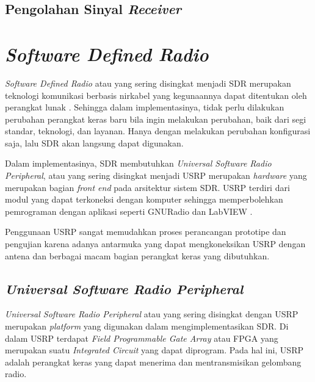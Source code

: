 
\subsection{Pengolahan Sinyal \textit{Receiver}}



\section{\textit{Software Defined Radio}}
\textit{Software Defined Radio} atau yang sering disingkat menjadi SDR merupakan teknologi komunikasi berbasis nirkabel yang kegunaannya dapat ditentukan oleh perangkat lunak \cite{Anisah2018}. Sehingga dalam implementasinya, tidak perlu dilakukan perubahan perangkat keras baru bila ingin melakukan perubahan, baik dari segi standar, teknologi, dan layanan. Hanya dengan melakukan perubahan konfigurasi saja, lalu SDR akan langsung dapat digunakan. 

Dalam implementasinya, SDR membutuhkan \textit{Universal Software Radio Peripheral}, atau yang sering disingkat menjadi USRP merupakan \textit{hardware} yang merupakan bagian \textit{front end} pada arsitektur sistem SDR. USRP terdiri dari modul yang dapat terkoneksi dengan komputer sehingga memperbolehkan pemrograman dengan aplikasi seperti GNURadio dan LabVIEW \cite{Gulo2023}. 

Penggunaan USRP sangat memudahkan proses perancangan prototipe dan pengujian karena adanya antarmuka yang dapat mengkoneksikan USRP dengan antena dan berbagai macam bagian perangkat keras yang dibutuhkan.

\subsection{\textit{Universal Software Radio Peripheral}}

\textit{Universal Software Radio Peripheral} atau yang sering disingkat dengan USRP merupakan \textit{platform} yang digunakan dalam mengimplementasikan SDR. Di dalam USRP terdapat \textit{Field Programmable Gate Array} atau FPGA yang merupakan suatu \textit{Integrated Circuit} yang dapat diprogram. Pada hal ini, USRP adalah perangkat keras yang dapat menerima dan mentransmisikan gelombang radio.

